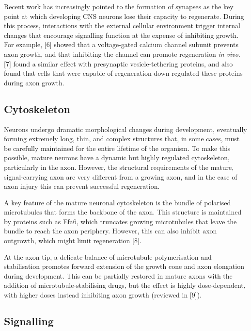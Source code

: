 \documentclass[
  12pt,
  a4paper,
]{book}
\begin{document}
Recent work has increasingly pointed to the formation of synapses as the key point at which developing CNS neurons lose their capacity to regenerate. During this process, interactions with the external cellular environment trigger internal changes that encourage signalling function at the expense of inhibiting growth. For example, {[}6{]} showed that a voltage-gated calcium channel subunit prevents axon growth, and that inhibiting the channel can promote regeneration \emph{in vivo}. {[}7{]} found a similar effect with presynaptic vesicle-tethering proteins, and also found that cells that were capable of regeneration down-regulated these proteins during axon growth.

\hypertarget{cytoskeleton}{%
\subsection{Cytoskeleton}\label{cytoskeleton}}

Neurons undergo dramatic morphological changes during development, eventually forming extremely long, thin, and complex structures that, in some cases, must be carefully maintained for the entire lifetime of the organism. To make this possible, mature neurons have a dynamic but highly regulated cytoskeleton, particularly in the axon. However, the structural requirements of the mature, signal-carrying axon are very different from a growing axon, and in the case of axon injury this can prevent successful regeneration.

A key feature of the mature neuronal cytoskeleton is the bundle of polarised microtubules that forms the backbone of the axon. This structure is maintained by proteins such as Efa6, which truncates growing microtubules that leave the bundle to reach the axon periphery. However, this can also inhibit axon outgrowth, which might limit regeneration {[}8{]}.

At the axon tip, a delicate balance of microtubule polymerisation and stabilisation promotes forward extension of the growth cone and axon elongation during development. This can be partially restored in mature axons with the addition of microtubule-stabilising drugs, but the effect is highly dose-dependent, with higher doses instead inhibiting axon growth (reviewed in {[}9{]}).

\hypertarget{signalling}{%
\subsection{Signalling}\label{signalling}}
\end{document}

